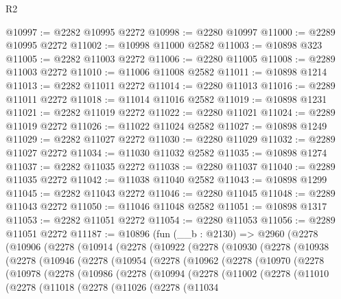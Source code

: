 \begin{lexlean}{R2}
\begin{coremodule}
@10997 := @2282 @10995 @2272
@10998 := @2280 @10997
@11000 := @2289 @10995 @2272
@11002 := @10998 @11000 @2582
@11003 := @10898 @323
@11005 := @2282 @11003 @2272
@11006 := @2280 @11005
@11008 := @2289 @11003 @2272
@11010 := @11006 @11008 @2582
@11011 := @10898 @1214
@11013 := @2282 @11011 @2272
@11014 := @2280 @11013
@11016 := @2289 @11011 @2272
@11018 := @11014 @11016 @2582
@11019 := @10898 @1231
@11021 := @2282 @11019 @2272
@11022 := @2280 @11021
@11024 := @2289 @11019 @2272
@11026 := @11022 @11024 @2582
@11027 := @10898 @1249
@11029 := @2282 @11027 @2272
@11030 := @2280 @11029
@11032 := @2289 @11027 @2272
@11034 := @11030 @11032 @2582
@11035 := @10898 @1274
@11037 := @2282 @11035 @2272
@11038 := @2280 @11037
@11040 := @2289 @11035 @2272
@11042 := @11038 @11040 @2582
@11043 := @10898 @1299
@11045 := @2282 @11043 @2272
@11046 := @2280 @11045
@11048 := @2289 @11043 @2272
@11050 := @11046 @11048 @2582
@11051 := @10898 @1317
@11053 := @2282 @11051 @2272
@11054 := @2280 @11053
@11056 := @2289 @11051 @2272
@11187 := @10896
    (fun (__b : @2130) =>
    @2960
      (@2278
        (@10906
          (@2278
            (@10914
              (@2278
                (@10922
                  (@2278
                    (@10930
                      (@2278
                        (@10938
                          (@2278
                            (@10946
                              (@2278
                                (@10954
                                  (@2278
                                    (@10962
                                      (@2278
                                        (@10970
                                          (@2278
                                            (@10978
                                              (@2278
                                                (@10986
                                                  (@2278
                                                    (@10994
                                                      (@2278
                                                        (@11002
                                                          (@2278
                                                            (@11010
                                                              (@2278
                                                                (@11018
                                                                  (@2278
                                                                    (@11026
                                                                      (@2278
                                                                        (@11034

\end{coremodule}
\end{lexlean}
